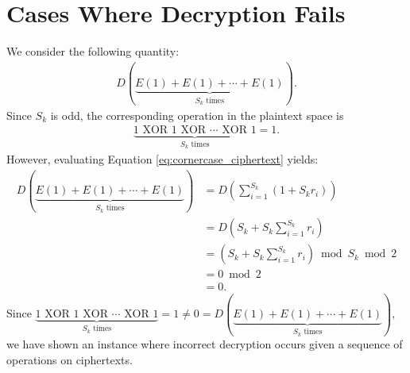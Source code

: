\section{Cases Where Decryption Fails}
We consider the following quantity:
\begin{align}
	\label{eq:cornercase_ciphertext}
	D(\underbrace{E(1)+E(1)+\cdots+E(1)}_{S_k \text{ times}}).
\end{align}
Since $S_k$ is odd, the corresponding operation in the plaintext space is
\begin{align*}
	\label{eq:cornercase_plaintext}
	\underbrace{1 \text{ XOR } 1 \text{ XOR } \cdots \text{ XOR } 1}_{S_k \text{ times}} = 1.
\end{align*}
However, evaluating Equation \ref{eq:cornercase_ciphertext} yields:
\begin{align*}
	D(\underbrace{E(1)+E(1)+\cdots+E(1)}_{S_k \text{ times}})
	&= D\left(\sum_{i=1}^{S_k}{(1+S_kr_i)}\right)\\
	&= D\left(S_k + S_k\sum_{i=1}^{S_k}{r_i}\right)\\
	&= \left(S_k + S_k\sum_{i=1}^{S_k}{r_i}\right) \bmod S_k \bmod 2\\
	&= 0 \bmod 2\\
	&= 0.
\end{align*}
Since $\underbrace{1 \text{ XOR } 1 \text{ XOR } \cdots \text{ XOR } 1}_{S_k \text{ times}} = 1\neq 0 = D(\underbrace{E(1)+E(1)+\cdots+E(1)}_{S_k \text{ times}})$, we have shown an instance where incorrect decryption occurs given a sequence of operations on ciphertexts.

